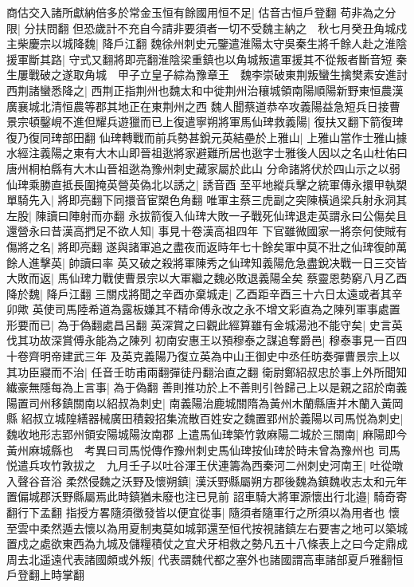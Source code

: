 商估交入諸所獻納倍多於常金玉恒有餘國用恒不足|{
	估音古恒戶登翻}
苟非為之分限|{
	分扶問翻}
但恐歲計不充自今請非要須者一切不受魏主納之　秋七月癸丑角城戍主柴慶宗以城降魏|{
	降戶江翻}
魏徐州刺史元鑒遣淮陽太守吳秦生將千餘人赴之淮陰援軍斷其路|{
	守式又翻將即亮翻淮陰梁重鎮也以角城叛遣軍援其不從叛者斷音短}
秦生屢戰破之遂取角城　甲子立皇子綜為豫章王　魏李崇破東荆叛蠻生擒樊素安進討西荆諸蠻悉降之|{
	西荆正指荆州也魏太和中徙荆州治穰城領南陽順陽新野東恒農漢廣襄城北清恒農等郡其地正在東荆州之西}
魏人聞蔡道恭卒攻義陽益急短兵日接曹景宗頓鑿峴不進但耀兵遊獵而已上復遣寧朔將軍馬仙琕救義陽|{
	復扶又翻下箭復琕復乃復同琕部田翻}
仙琕轉戰而前兵勢甚銳元英結壘於上雅山|{
	上雅山當作士雅山據水經注義陽之東有大木山即晉祖逖將家避難所居也逖字士雅後人因以之名山杜佑曰唐州桐柏縣有大木山晉祖逖為豫州刺史藏家屬於此山}
分命諸將伏於四山示之以弱仙琕乘勝直抵長圍掩英營英偽北以誘之|{
	誘音酉}
至平地縱兵擊之統軍傳永擐甲執槊單騎先入|{
	將即亮翻下同擐音宦槊色角翻}
唯軍主蔡三虎副之突陳橫過梁兵射永洞其左股|{
	陳讀曰陣射而亦翻}
永拔箭復入仙琕大敗一子戰死仙琕退走英謂永曰公傷矣且還營永曰昔漢高捫足不欲人知|{
	事見十卷漢高祖四年}
下官雖微國家一將奈何使賊有傷將之名|{
	將即亮翻}
遂與諸軍追之盡夜而返時年七十餘矣軍中莫不壯之仙琕復帥萬餘人進擊英|{
	帥讀曰率}
英又破之殺將軍陳秀之仙琕知義陽危急盡銳决戰一日三交皆大敗而返|{
	馬仙琕力戰使曹景宗以大軍繼之魏必敗退義陽全矣}
蔡靈恩勢窮八月乙酉降於魏|{
	降戶江翻}
三關戍將聞之辛酉亦棄城走|{
	乙酉距辛酉三十六日太遠或者其辛卯歟}
英使司馬陸希道為露板嫌其不精命傅永改之永不增文彩直為之陳列軍事處置形要而已|{
	為于偽翻處昌呂翻}
英深賞之曰觀此經算雖有金城湯池不能守矣|{
	史言英伐其功故深賞傅永能為之陳列}
初南安惠王以預穆泰之謀追奪爵邑|{
	穆泰事見一百四十卷齊明帝建武三年}
及英克義陽乃復立英為中山王御史中丞任昉奏彈曹景宗上以其功臣寢而不治|{
	任音壬昉甫兩翻彈徒丹翻治直之翻}
衛尉鄭紹叔忠於事上外所聞知纎豪無隱每為上言事|{
	為于偽翻}
善則推功於上不善則引咎歸己上以是親之詔於南義陽置司州移鎮關南以紹叔為刺史|{
	南義陽治鹿城關隋為黃州木蘭縣唐并木蘭入黃岡縣}
紹叔立城隍繕器械廣田積穀招集流散百姓安之魏置郢州於義陽以司馬悦為刺史|{
	魏收地形志郢州領安陽城陽汝南郡}
上遣馬仙琕築竹敦麻陽二城於三關南|{
	麻陽即今黃州麻城縣也　考異曰司馬悦傳作豫州刺史馬仙琕按仙琕於時未曾為豫州也}
司馬悦遣兵攻竹敦拔之　九月壬子以吐谷渾王伏連籌為西秦河二州刺史河南王|{
	吐從暾入聲谷音浴}
柔然侵魏之沃野及懷朔鎮|{
	漢沃野縣屬朔方郡後魏為鎮魏收志太和元年置偏城郡沃野縣屬焉此時鎮猶未廢也注已見前}
詔車騎大將軍源懷出行北邉|{
	騎奇寄翻行下孟翻}
指授方畧隨須徵發皆以便宜從事|{
	隨須者隨軍行之所須以為用者也}
懷至雲中柔然遁去懷以為用夏制夷莫如城郭還至恒代按視諸鎮左右要害之地可以築城置戍之處欲東西為九城及儲糧積仗之宜犬牙相救之勢凡五十八條表上之曰今定鼎成周去北遥遠代表諸國頗或外叛|{
	代表謂魏代都之塞外也諸國謂高車諸部夏戶雅翻恒戶登翻上時掌翻}
